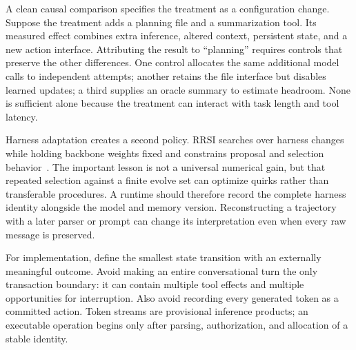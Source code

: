 A clean causal comparison specifies the treatment as a configuration change. Suppose the treatment adds a planning file and a summarization tool. Its measured effect combines extra inference, altered context, persistent state, and a new action interface. Attributing the result to ``planning'' requires controls that preserve the other differences. One control allocates the same additional model calls to independent attempts; another retains the file interface but disables learned updates; a third supplies an oracle summary to estimate headroom. None is sufficient alone because the treatment can interact with task length and tool latency.

Harness adaptation creates a second policy. RRSI searches over harness changes while holding backbone weights fixed and constrains proposal and selection behavior~\cite{rrsi2026}. The important lesson is not a universal numerical gain, but that repeated selection against a finite evolve set can optimize quirks rather than transferable procedures. A runtime should therefore record the complete harness identity alongside the model and memory version. Reconstructing a trajectory with a later parser or prompt can change its interpretation even when every raw message is preserved.

For implementation, define the smallest state transition with an externally meaningful outcome. Avoid making an entire conversational turn the only transaction boundary: it can contain multiple tool effects and multiple opportunities for interruption. Also avoid recording every generated token as a committed action. Token streams are provisional inference products; an executable operation begins only after parsing, authorization, and allocation of a stable identity.

